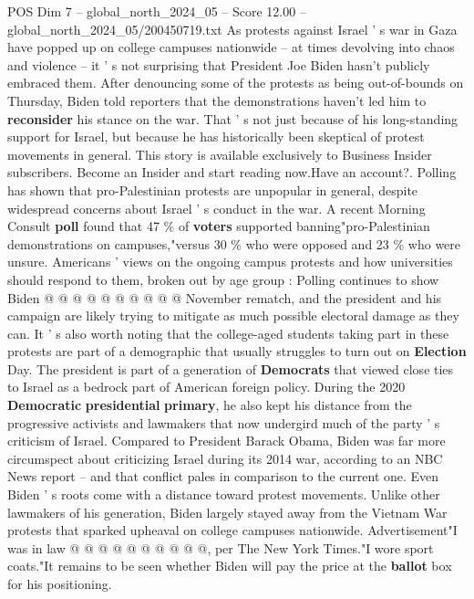 \begin{textsample}{POS Dim 7 – global\_north\_2024\_05 – Score 12.00 – global\_north\_2024\_05/200450719.txt}  \label{ex:f7_pos_051}
As protests against Israel ' s war in Gaza have popped up on college campuses nationwide -- at times devolving into chaos and violence -- it ' s not surprising that President Joe Biden hasn't publicly embraced them.
After denouncing some of the protests as being out-of-bounds on Thursday, Biden told reporters that the demonstrations haven't led him to \textbf{reconsider} his stance on the war.
That ' s not just because of his long-standing support for Israel, but because he has historically been skeptical of protest movements in general.
This story is available exclusively to Business Insider subscribers.
Become an Insider and start reading now.Have an account?.
Polling has shown that pro-Palestinian protests are unpopular in general, despite widespread concerns about Israel ' s conduct in the war.
A recent Morning Consult \textbf{poll} found that 47 \% of \textbf{voters} supported banning"pro-Palestinian demonstrations on campuses,"versus 30 \% who were opposed and 23 \% who were unsure.
Americans ' views on the ongoing campus protests and how universities should respond to them, broken out by age group : Polling continues to show Biden @ @ @ @ @ @ @ @ @ @ November rematch, and the president and his campaign are likely trying to mitigate as much possible electoral damage as they can.
It ' s also worth noting that the college-aged students taking part in these protests are part of a demographic that usually struggles to turn out on \textbf{Election} Day.
The president is part of a generation of \textbf{Democrats} that viewed close ties to Israel as a bedrock part of American foreign policy.
During the 2020 \textbf{Democratic} \textbf{presidential} \textbf{primary}, he also kept his distance from the progressive activists and lawmakers that now undergird much of the party ' s criticism of Israel.
Compared to President Barack Obama, Biden was far more circumspect about criticizing Israel during its 2014 war, according to an NBC News report -- and that conflict pales in comparison to the current one.
Even Biden ' s roots come with a distance toward protest movements.
Unlike other lawmakers of his generation, Biden largely stayed away from the Vietnam War protests that sparked upheaval on college campuses nationwide.
Advertisement"I was in law @ @ @ @ @ @ @ @ @ @, per The New York Times."I wore sport coats."It remains to be seen whether Biden will pay the price at the \textbf{ballot} box for his positioning.

\end{textsample}
